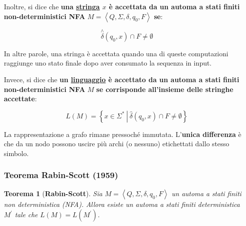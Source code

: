 \documentclass[a4paper]{article}
\newtheorem{theorem}{Teorema}
\begin{document}
	\noindent
	Inoltre, si dice che \textcolor{Red3}{\textbf{una \underline{stringa} $x$ è accettata da un automa a stati finiti non-deterministici NFA}} $M = \left\langle Q, \Sigma, \delta, q_{0}, F\right\rangle$ \textbf{se}:
	
	\begin{equation*}
		\overset{\wedge}{\delta} \left(q_{0}, x\right) \cap F \ne \emptyset
	\end{equation*}

	\noindent
	In altre parole, una stringa è accettata quando una di queste computazioni raggiunge uno stato finale dopo aver consumato la sequenza in input.

	Invece, si dice che \textcolor{Red3}{\textbf{un \underline{linguaggio} è accettato da un automa a stati finiti non-deterministici NFA}} $M$ \textbf{se corrisponde all'insieme delle stringhe accettate}:
	
	\begin{equation*}
		L\left(M\right) = \left\{x \in \Sigma^{*} \: \left| \: \hat{\delta} \left(q_{0}, x\right) \cap F \ne \emptyset\right.\right\}
	\end{equation*}

	La rappresentazione a grafo rimane pressoché immutata. L'\textbf{unica differenza} è che da un nodo possono uscire più archi (o nessuno) etichettati dallo stesso simbolo.
	
	\newpage
	
	\subsubsection{Teorema Rabin-Scott (1959)}
	
	\begin{theorem}[\textbf{Rabin-Scott}] \label{rabin-scott}
		Sia $M = \left\langle Q, \Sigma, \delta, q_{0}, F \right\rangle$ un automa a stati finiti non deterministica (NFA). Allora esiste un automa a stati finiti deterministica $M^{'}$ tale che $L\left(M\right) = L(M^{'})$.
	\end{theorem}
\end{document}
